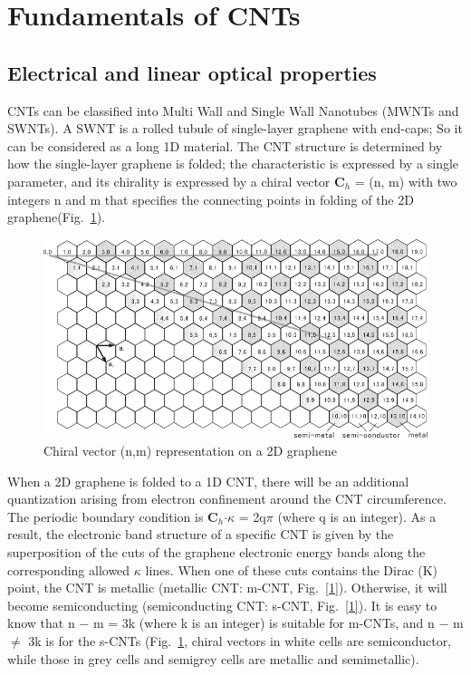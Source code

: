 \documentclass{phyasgn}\usepackage{nag}
\newcommand{\figref}[1]{Fig.~\ref{#1}}
\begin{document}
\section{Fundamentals of CNTs}
\subsection{Electrical and linear optical properties}
CNTs can be classified into Multi Wall and Single Wall Nanotubes (MWNTs and SWNTs). A SWNT is a rolled tubule of single-layer graphene with end-caps; So it can be considered as a long 1D material. The CNT structure is determined by how the single-layer graphene is folded; the characteristic is expressed by a single parameter, and its chirality is expressed by a chiral vector \textbf{C$_h$} = (n, m) with two integers n and m that specifies the connecting points in folding of the 2D graphene(\figref{2}). 
\begin{figure}[!h]
	\centering
	\includegraphics[width=.85\linewidth]{pic/2.png}
	\caption[Chiral vector (n,m) representation on a 2D graphene]{Chiral vector (n,m) representation on a 2D graphene\cite{set2004ultrafast}}
	\label{2}
	\end{figure}
\par When a 2D graphene is folded to a 1D CNT, there will be an additional quantization arising from electron confinement around the CNT circumference. The periodic
boundary condition is \textbf{C$_h$}$\cdot \kappa$ = 2q$\pi$ (where q is an integer). As a result, the electronic band structure of a specific CNT is given by the superposition of the cuts of the graphene electronic energy bands along the corresponding allowed $\kappa$ lines. When one of these cuts contains the Dirac (K) point, the CNT is metallic (metallic CNT: m-CNT, \figref{1}). Otherwise, it will become semiconducting (semiconducting CNT: s-CNT, \figref{1}). It is easy to know that n − m = 3k (where k is an integer) is suitable for m-CNTs, and n − m $\neq$ 3k is for the s-CNTs (\figref{2}, chiral vectors in white cells are semiconductor, while those in grey cells and semigrey cells are metallic and semimetallic). 
\end{document}
